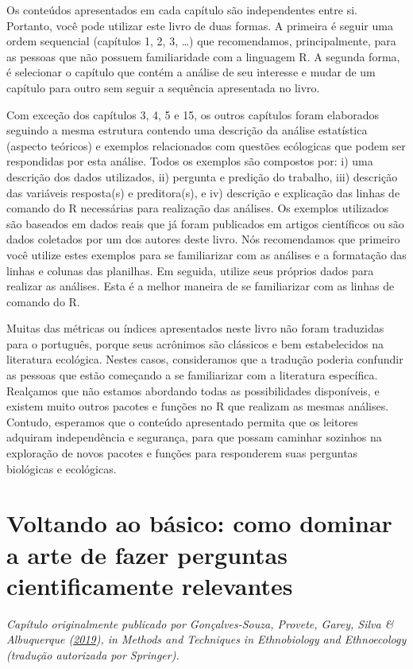 \documentclass[
]{article}
\begin{document}
Os conteúdos apresentados em cada capítulo são independentes entre si. Portanto, você pode utilizar este livro de duas formas. A primeira é seguir uma ordem sequencial (capítulos 1, 2, 3, \ldots) que recomendamos, principalmente, para as pessoas que não possuem familiaridade com a linguagem R. A segunda forma, é selecionar o capítulo que contém a análise de seu interesse e mudar de um capítulo para outro sem seguir a sequência apresentada no livro.

Com exceção dos capítulos 3, 4, 5 e 15, os outros capítulos foram elaborados seguindo a mesma estrutura contendo uma descrição da análise estatística (aspecto teóricos) e exemplos relacionados com questões ecólogicas que podem ser respondidas por esta análise. Todos os exemplos são compostos por: i) uma descrição dos dados utilizados, ii) pergunta e predição do trabalho, iii) descrição das variáveis resposta(s) e preditora(s), e iv) descrição e explicação das linhas de comando do R necessárias para realização das análises. Os exemplos utilizados são baseados em dados reais que já foram publicados em artigos científicos ou são dados coletados por um dos autores deste livro. Nós recomendamos que primeiro você utilize estes exemplos para se familiarizar com as análises e a formatação das linhas e colunas das planilhas. Em seguida, utilize seus próprios dados para realizar as análises. Esta é a melhor maneira de se familiarizar com as linhas de comando do R.

Muitas das métricas ou índices apresentados neste livro não foram traduzidas para o português, porque seus acrônimos são clássicos e bem estabelecidos na literatura ecológica. Nestes casos, consideramos que a tradução poderia confundir as pessoas que estão começando a se familiarizar com a literatura específica. Realçamos que não estamos abordando todas as possibilidades disponíveis, e existem muito outros pacotes e funções no R que realizam as mesmas análises. Contudo, esperamos que o conteúdo apresentado permita que os leitores adquiram independência e segurança, para que possam caminhar sozinhos na exploração de novos pacotes e funções para responderem suas perguntas biológicas e ecológicas.

\hypertarget{cap3}{%
\section{Voltando ao básico: como dominar a arte de fazer perguntas cientificamente relevantes}\label{cap3}}

\emph{Capítulo originalmente publicado por Gonçalves-Souza, Provete, Garey, Silva \& Albuquerque (\protect\hyperlink{ref-albuquerque_going_2019}{2019}), in Methods and Techniques in Ethnobiology and Ethnoecology (tradução autorizada por Springer).}
\end{document}
